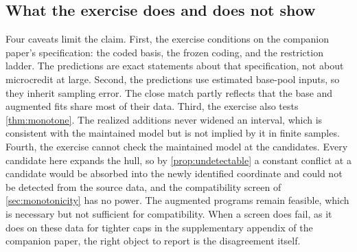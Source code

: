 \subsection{What the exercise does and does not show}
\label{subsec:case-caveats}

Four caveats limit the claim. First, the exercise conditions on the
companion paper's specification: the coded basis, the frozen coding,
and the restriction ladder. The predictions are exact statements about
that specification, not about microcredit at large. Second, the
predictions use estimated base-pool inputs, so they inherit sampling
error. The close match partly reflects that the base and augmented fits
share most of their data. Third, the exercise also tests
\cref{thm:monotone}. The realized additions never widened an interval,
which is consistent with the maintained model but is not implied by it
in finite samples. Fourth, the exercise cannot check the maintained
model at the candidates. Every candidate here expands the hull, so by
\cref{prop:undetectable} a constant conflict at a candidate would be
absorbed into the newly identified coordinate and could not be detected
from the source data, and the compatibility screen of
\cref{sec:monotonicity} has no power. The augmented programs remain
feasible, which is necessary but not sufficient for compatibility. When a screen does fail, as it does on these data for tighter caps
in the supplementary appendix of the companion paper, the right object
to report is the disagreement itself.
